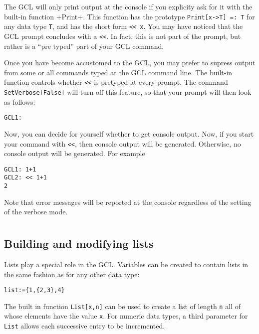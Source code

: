 The GCL will only print output at the console if you explicity ask for
it with the built-in function \tindex+Print+.  This function has the
prototype \verb+Print[x->T] =: T+ for any data type \verb+T+, and has
the short form \verb+<< x+.  You may have noticed that the GCL prompt
concludes with a \verb+<<+.  In fact, this is not part of the prompt,
but rather is a ``pre typed'' part of your GCL command.  

Once you have become accustomed to the GCL, you may prefer to supress
output from some or all commands typed at the GCL command line.  The
built-in function  controls whether \verb+<<+ is
pretyped at every prompt.  The command \verb+SetVerbose[False]+ will
turn off this feature, so that your prompt will then look as
follows:

\begin{verbatim}
GCL1: 
\end{verbatim}

Now, you can decide for yourself whether to get console output.  Now,
if you start your command with \verb+<<+, then console output will be
generated.  Otherwise, no console output will be generated.  For example

\begin{verbatim}
GCL1: 1+1
GCL2: << 1+1
2
\end{verbatim}

Note that error messages will be reported at the console regardless of
the setting of the verbose mode.


\section{}

\subsection{Building and modifying lists}
Lists play a special role in the GCL.  Variables can be created to
contain lists in the same fashion as for any other data type:  

\begin{verbatim}
list:={1,{2,3},4}
\end{verbatim}

The built in function \verb+List[x,n]+ can be used to
create a list of length \verb+n+ all of whose elements have the value
\verb+x+.  For numeric data types, a third parameter for \verb+List+
allows each successive entry to be incremented.

